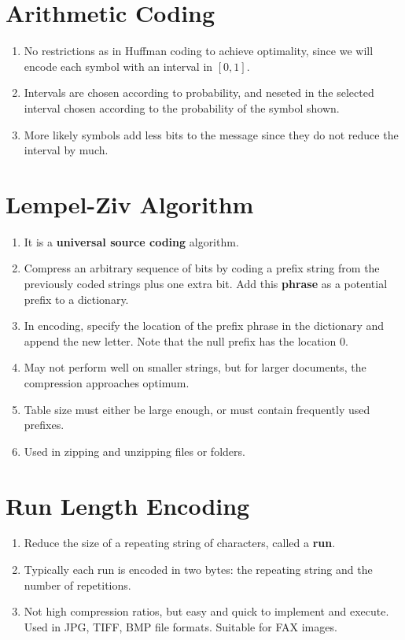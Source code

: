 \documentclass[journal,12pt,twocolumn]{IEEEtran}
\renewcommand\thesection{\arabic{section}}
\begin{document}
\section{Arithmetic Coding}
\begin{enumerate}[label=\thesection.\arabic*, ref=\thesection.\theenumi]
    \item No restrictions as in Huffman coding to achieve optimality, since 
    we will encode each symbol with an interval in $[0,1]$.
    \item Intervals are chosen according to probability, and neseted in the
    selected interval chosen according to the probability of the symbol 
    shown.
    \item More likely symbols add less bits to the message since they do not 
    reduce the interval by much.
\end{enumerate}

\section{Lempel-Ziv Algorithm}
\begin{enumerate}[label=\thesection.\arabic*, ref=\thesection.\theenumi]
    \item It is a \textbf{universal source coding} algorithm.
    \item Compress an arbitrary sequence of bits by coding a prefix string
    from the previously coded strings plus one extra bit. Add this 
    \textbf{phrase} as a potential prefix to a dictionary.
    \item In encoding, specify the location of the prefix phrase in the 
    dictionary and append the new letter. Note that the null prefix has
    the location 0.
    \item May not perform well on smaller strings, but for larger documents,
    the compression approaches optimum.
    \item Table size must either be large enough, or must contain frequently
    used prefixes.
    \item Used in zipping and unzipping files or folders.
\end{enumerate}

\section{Run Length Encoding}
\begin{enumerate}[label=\thesection.\arabic*, ref=\thesection.\theenumi]
    \item Reduce the size of a repeating string of characters, called a
    \textbf{run}.
    \item Typically each run is encoded in two bytes: the repeating string
    and the number of repetitions.
    \item Not high compression ratios, but easy and quick to implement
    and execute. Used in JPG, TIFF, BMP file formats. Suitable for FAX 
    images.
\end{enumerate}
\end{document}
